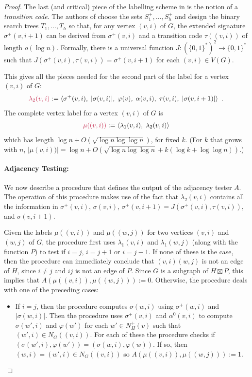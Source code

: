 \documentclass[twoside,leqno]{article}
\makeatletter
\newcommand{\defin}[1]{\emph{\textcolor{brightmaroon}{#1}}}
\def\mathcolor#1#{\@mathcolor{#1}}
\def\@mathcolor#1#2#3{%
  \protect\leavevmode
  \begingroup
    \color#1{#2}#3%
  \endgroup
}
\newcommand{\mathdefin}[1]{\mathcolor{brightmaroon}{#1}}
\newcommand{\Oh}{O}
\makeatother
\begin{document}
\begin{proof}
  The last (and critical) piece of the labelling scheme in \cite{dujmovic.esperet.ea:adjacency} is the notion of a \defin{transition code}. The authors of \cite{dujmovic.esperet.ea:adjacency} choose the sets $S^+_1,\ldots,S^+_h$ and design the binary search trees $T_1,\ldots,T_h$ so that, for any vertex $(v,i)$ of $G$, the extended signature $\sigma^+(v,i+1)$ can be derived from $\sigma^+(v,i)$ and a transition code \defin{$\tau((v,i))$} of length $o(\log n)$. Formally, there is a universal function $J:(\{0,1\}^*)^2\to\{0,1\}^*$ such that $J(\sigma^+(v,i),\tau(v,i))=\sigma^+(v,i+1)$ for each $(v,i)\in V(G)$.

  This gives all the pieces needed for the second part of the label for a vertex $(v,i)$ of $G$:
  \[
    \mathdefin{\lambda_2(v,i)} := \langle \sigma^+(v,i),\; |\sigma(v,i)|,\; \varphi(v),\; \alpha(v,i),\; \tau(v,i),\; |\sigma(v,i+1)| \rangle  \enspace .
  \]
  The complete vertex label for a vertex $(v,i)$ of $G$ is
  \[
    \mathdefin{\mu((v,i))} := \langle \lambda_1(v,i),\; \lambda_2(v,i) \rangle
  \]
  which has length $\log n + O(\sqrt{\log n\log\log n})$, for fixed $k$.  (For $k$ that grows with $n$, $|\mu(v,i))|=\log n + \Oh(\sqrt{\log n\log\log n} + k(\log k + \log\log n))$.)

  \paragraph{Adjacency Testing:}

  We now describe a procedure that defines the output of the adjacency tester $A$.
  The operation of this procedure makes use of the fact that $\lambda_2(v,i)$ contains all the information in $\sigma^+(v,i)$, $\sigma(v,i)$, $\sigma^+(v,i+1)=J(\sigma^+(v,i),\tau(v,i))$, and $\sigma(v,i+1)$.

  Given the labels $\mu((v,i))$ and $\mu((w,j))$ for two vertices $(v,i)$ and $(w,j)$ of $G$, the procedure first uses $\lambda_1(v,i)$ and $\lambda_1(w,j)$ (along with the function $P$) to test if $i=j$, $i=j+1$ or $i=j-1$.  If none of these is the case, then the procedure can immediately conclude that $(v,i)(w,j)$ is not an edge of $H$, since $i\neq j$ and $ij$ is not an edge of $P$.  Since $G$ is a subgraph of $H\boxtimes P$, this implies that $A(\mu((v,i)),\mu((w,j))):=0$.  Otherwise, the procedure deals with one of the preceding cases:
  \begin{itemize}
    \item If $i=j$, then the procedure computes $\sigma(w,i)$ using $\sigma^+(w,i)$ and $|\sigma(w,i)|$.  Then the procedure uses $\sigma^+(v,i)$ and $\alpha^0(v,i)$ to compute $\sigma(w',i)$ and $\varphi(w')$ for each $w'\in N^+_H(v)$ such that $(w',i)\in N_G((v,i))$.  For each of these the procedure checks if $(\sigma(w',i),\varphi(w'))=(\sigma(w,i),\varphi(w))$. If so, then $(w,i)=(w',i)\in N_G((v,i))$ so $A(\mu((v,i)),\mu((w,j))):=1$.


\end{itemize}
\end{proof}
\end{document}
